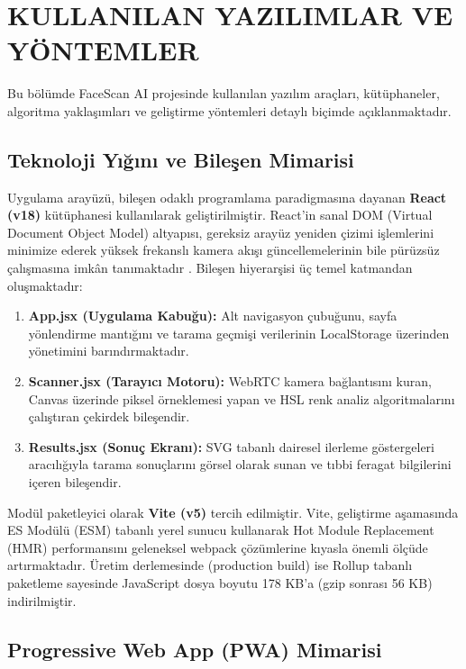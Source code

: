 \section{KULLANILAN YAZILIMLAR VE YÖNTEMLER}

Bu bölümde FaceScan AI projesinde kullanılan yazılım araçları, kütüphaneler, algoritma yaklaşımları ve geliştirme yöntemleri detaylı biçimde açıklanmaktadır.

\subsection{Teknoloji Yığını ve Bileşen Mimarisi}

Uygulama arayüzü, bileşen odaklı programlama paradigmasına dayanan \textbf{React (v18)} kütüphanesi kullanılarak geliştirilmiştir. React'in sanal DOM (Virtual Document Object Model) altyapısı, gereksiz arayüz yeniden çizimi işlemlerini minimize ederek yüksek frekanslı kamera akışı güncellemelerinin bile pürüzsüz çalışmasına imkân tanımaktadır \cite{react2023component}. Bileşen hiyerarşisi üç temel katmandan oluşmaktadır:

\begin{enumerate}
  \item \textbf{App.jsx (Uygulama Kabuğu):} Alt navigasyon çubuğunu, sayfa yönlendirme mantığını ve tarama geçmişi verilerinin LocalStorage üzerinden yönetimini barındırmaktadır.
  \item \textbf{Scanner.jsx (Tarayıcı Motoru):} WebRTC kamera bağlantısını kuran, Canvas üzerinde piksel örneklemesi yapan ve HSL renk analiz algoritmalarını çalıştıran çekirdek bileşendir.
  \item \textbf{Results.jsx (Sonuç Ekranı):} SVG tabanlı dairesel ilerleme göstergeleri aracılığıyla tarama sonuçlarını görsel olarak sunan ve tıbbi feragat bilgilerini içeren bileşendir.
\end{enumerate}

Modül paketleyici olarak \textbf{Vite (v5)} tercih edilmiştir. Vite, geliştirme aşamasında ES Modülü (ESM) tabanlı yerel sunucu kullanarak Hot Module Replacement (HMR) performansını geleneksel webpack çözümlerine kıyasla önemli ölçüde artırmaktadır. Üretim derlemesinde (production build) ise Rollup tabanlı paketleme sayesinde JavaScript dosya boyutu 178 KB'a (gzip sonrası 56 KB) indirilmiştir.

\subsection{Progressive Web App (PWA) Mimarisi}

